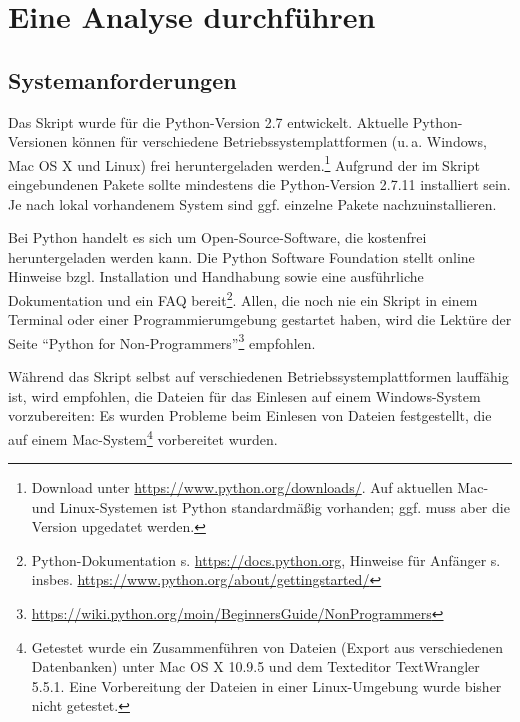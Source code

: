 \section{Eine Analyse durchführen}
\label{analysis}

\subsection{Systemanforderungen}
\label{requirements}
Das Skript wurde für die Python-Version 2.7 entwickelt. Aktuelle Python-Versionen können für verschiedene Betriebssystemplattformen (u.\,a. Windows, Mac OS X und Linux) frei heruntergeladen werden.\footnote{Download unter \url{https://www.python.org/downloads/}. Auf aktuellen Mac- und Linux-Systemen ist Python standardmäßig vorhanden; ggf. muss aber die Version upgedatet werden.} Aufgrund der im Skript eingebundenen Pakete sollte mindestens die Python-Version 2.7.11 installiert sein. Je nach lokal vorhandenem System sind ggf. einzelne Pakete nachzuinstallieren.

Bei Python handelt es sich um Open-Source-Software, die kostenfrei heruntergeladen werden kann. Die Python Software Foundation stellt online Hinweise bzgl. Installation und Handhabung sowie eine ausführliche Dokumentation und ein FAQ bereit\footnote{Python-Dokumentation s. \url{https://docs.python.org}, Hinweise für Anfänger s. insbes. \url{https://www.python.org/about/gettingstarted/}}. Allen, die noch nie ein Skript in einem Terminal oder einer Programmierumgebung gestartet haben, wird die Lektüre der Seite "`Python for Non-Programmers"'\footnote{\url{https://wiki.python.org/moin/BeginnersGuide/NonProgrammers}} empfohlen.

Während das Skript selbst auf verschiedenen Betriebssystemplattformen lauffähig ist, wird empfohlen, die Dateien für das Einlesen auf einem Windows-System vorzubereiten: Es wurden Probleme beim Einlesen von Dateien festgestellt, die auf einem Mac-System\footnote{Getestet wurde ein Zusammenführen von Dateien (Export aus verschiedenen Datenbanken) unter Mac OS X 10.9.5 und dem Texteditor TextWrangler 5.5.1. Eine Vorbereitung der Dateien in einer Linux-Umgebung wurde bisher nicht getestet.} vorbereitet wurden.

